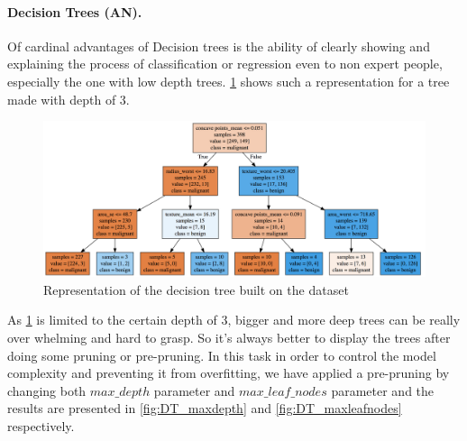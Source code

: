 \documentclass[12pt, a4paper]{scrartcl}
\begin{document}

\paragraph{Decision Trees (AN).} Of cardinal advantages of Decision trees is the ability of clearly showing and explaining the process of classification or regression even to non expert people, especially the one with low depth trees. \cref{fig:graphviz} shows such a representation for a tree made with depth of 3. 

\begin{figure}
	\centering
	\includegraphics[width=\textwidth]{graphviz}
	\caption{Representation of the decision tree built on the dataset}
	\label{fig:graphviz}
\end{figure}

As \cref{fig:graphviz} is limited to the certain depth of 3, bigger and more deep trees can be really over whelming and hard to grasp. So it's always better to display the trees after doing some pruning or pre-pruning. In this task in order to control the model complexity and preventing it from overfitting, we have applied a pre-pruning by changing both \emph{$max\_depth$} parameter and \emph{$max\_leaf\_nodes$} parameter and the results are presented in \cref{fig:DT_maxdepth} and \cref{fig:DT_maxleafnodes} respectively. 
\end{document}
